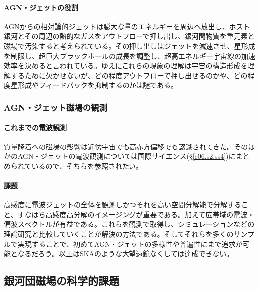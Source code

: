 \paragraph{AGN・ジェットの役割}

AGNからの相対論的ジェットは膨大な量のエネルギーを周辺へ放出し、ホスト銀河とその周辺の熱的なガスをアウトフローで押し出し、銀河間物質を重元素と磁場で汚染すると考えられている。その押し出しはジェットを減速させ、星形成を制限し、超巨大ブラックホールの成長を調整し、超高エネルギー宇宙線の加速効率を決めると言われている。ゆえにこれらの現象の理解は宇宙の構造形成を理解するために欠かせないが、どの程度アウトフローで押し出せるのかや、どの程度星形成やフィードバックを抑制するのかは謎である。

\subsubsection{AGN・ジェット磁場の観測}
\label{c06.s1.ss4.sss3}

\paragraph{これまでの電波観測}

質量降着への磁場の影響は近傍宇宙でも高赤方偏移でも認識されてきた\citep{1999Natur.397..324B,2014MNRAS.440.1551L}。そのほかのAGN・ジェットの電波観測については国際サイエンス(\S \ref{c06.s2.ss4})にまとめられているので、そちらを参照されたい。

\paragraph{課題}

高感度に電波ジェットの全体を観測しかつそれを高い空間分解能で分解すること、すなはち高感度高分解のイメージングが重要である。加えて広帯域の電波・偏波スペクトルが有益である。これらを観測で取得し、シミュレーションなどの理論研究と比較していくことが解決の方法である。そしてそれらを多くのサンプルで実現することで、初めてAGN・ジェットの多様性や普遍性にまで追求が可能となるだろう。以上はSKAのような大望遠鏡なくしては達成できない。


\subsection{銀河団磁場の科学的課題}
\label{c06.s1.ss5}

